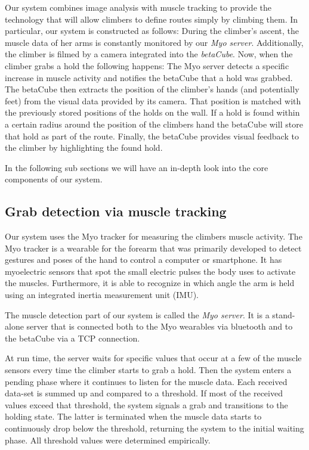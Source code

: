 Our system combines image analysis with muscle tracking to provide the technology that will allow climbers to define routes simply by climbing them.
In particular, our system is constructed as follows:
During the climber's ascent, the muscle data of her arms is constantly monitored by our \emph{Myo server}.
Additionally, the climber is filmed by a camera integrated into the \emph{betaCube}.
Now, when the climber grabs a hold the following happens:
The Myo server detects a specific increase in muscle activity and notifies the betaCube that a hold was grabbed.
The betaCube then extracts the position of the climber's hands (and potentially feet) from the visual data provided by its camera.
That position is matched with the previously stored positions of the holds on the wall.
If a hold is found within a certain radius around the position of the climbers hand the betaCube will store that hold as part of the route.
Finally, the betaCube provides visual feedback to the climber by highlighting the found hold.

In the following sub sections we will have an in-depth look into the core components of our system.

\subsection{Grab detection via muscle tracking}
Our system uses the Myo tracker for measuring the climbers muscle activity.
The Myo tracker is a wearable for the forearm that was primarily developed to detect gestures and poses of the hand to control a computer or smartphone.
It has myoelectric sensors that spot the small electric pulses the body uses to activate the muscles.
Furthermore, it is able to recognize in which angle the arm is held using an integrated inertia measurement unit (IMU).

The muscle detection part of our system is called the \emph{Myo server}.
It is a stand-alone server that is connected both to the Myo wearables via bluetooth and to the betaCube via a TCP connection.

At run time, the server waits for specific values that occur at a few of the muscle sensors every time the climber starts to grab a hold.
Then the system enters a pending phase where it continues to listen for the muscle data.
Each received data-set is summed up and compared to a threshold.
If most of the received values exceed that threshold, the system signals a grab and transitions to the holding state.
The latter is terminated when the muscle data starts to continuously drop below the threshold, returning the system to the initial waiting phase.
All threshold values were determined empirically.

